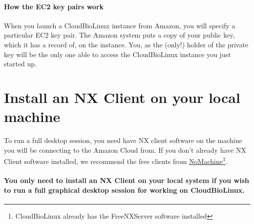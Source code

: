 \paragraph{How the EC2 key pairs work}

\paragraph{}When you launch a CloudBioLinux instance from  Amazon, you will specify a particular EC2 key pair. The Amazon system puts a copy of your public key, which it has a record of, on the instance. You, as the (only!) holder of the private key will be the only one able to access the CloudBioLinux instance you just started up. 


\section{Install an NX Client on your local machine}

\paragraph{}To run a full desktop session, you need have NX client software on the machine you will be connecting to the Amazon Cloud from. If you don't already have NX Client software installed, we recommend the free clients from \href{http://www.nomachine.com/download.php}{NoMachine}\footnote{CloudBioLinux already has the FreeNXServer software installed}.

\paragraph{You only need to install an NX Client on your local system if you wish to run a full graphical desktop session for working on CloudBioLinux.}  


